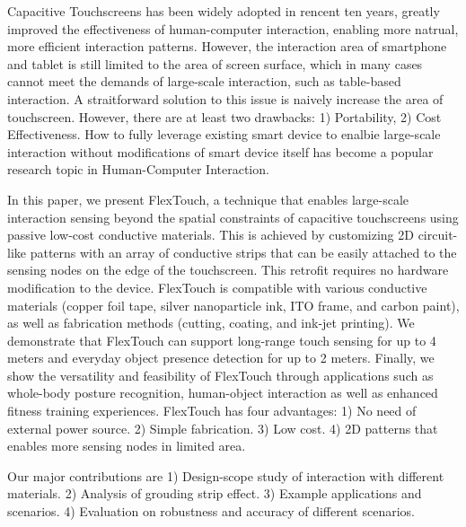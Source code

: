 \begin{eabstract}
  Capacitive Touchscreens has been widely adopted in rencent ten years, greatly improved the effectiveness of human-computer interaction, enabling more natrual, more efficient interaction patterns. However, the interaction area of smartphone and tablet is still limited to the area of screen surface, which in many cases cannot meet the demands of large-scale interaction, such as table-based interaction. A straitforward solution to this issue is naively increase the area of touchscreen. However, there are at least two drawbacks: 1) Portability, 2) Cost Effectiveness. How to fully leverage existing smart device to enalbie large-scale interaction without modifications of smart device itself has become a popular research topic in Human-Computer Interaction.

  In this paper, we present FlexTouch, a technique that enables large-scale interaction sensing beyond the spatial constraints of capacitive touchscreens using passive low-cost conductive materials. This is achieved by customizing 2D circuit-like patterns with an array of conductive strips that can be easily attached to the sensing nodes on the edge of the touchscreen. This retrofit requires no hardware modification to the device. FlexTouch is compatible with various conductive materials (copper foil tape, silver nanoparticle ink, ITO frame, and carbon paint), as well as fabrication methods (cutting, coating, and ink-jet printing). We demonstrate that FlexTouch can support long-range touch sensing for up to 4 meters and everyday object presence detection for up to 2 meters. Finally, we show the versatility and feasibility of FlexTouch through applications such as whole-body posture recognition, human-object interaction as well as enhanced fitness training experiences. FlexTouch has four advantages: 1) No need of external power source. 2) Simple fabrication. 3) Low cost. 4) 2D patterns that enables more sensing nodes in limited area.  
  
  Our major contributions are 1) Design-scope study of interaction with different materials. 2) Analysis of grouding strip effect. 3) Example applications and scenarios. 4) Evaluation on robustness and accuracy of different scenarios.
\end{eabstract}

